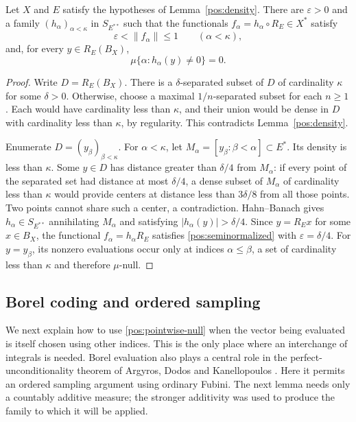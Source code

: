 \begin{lemma}\label{pos:family}
Let $X$ and $E$ satisfy the hypotheses of Lemma~\ref{pos:density}.
There are $\varepsilon>0$ and a family $(h_\alpha)_{\alpha<\kappa}$ in
$S_{E^{**}}$ such that the functionals
$f_\alpha=h_\alpha\circ R_E\in X^*$ satisfy
\begin{equation}\label{pos:seminormalized}
 \varepsilon<\|f_\alpha\|\le1\qquad(\alpha<\kappa),
\end{equation}
and, for every $y\in R_E(B_X)$,
\begin{equation}\label{pos:pointwise-null}
 \mu\{\alpha:h_\alpha(y)\ne0\}=0.
\end{equation}
\end{lemma}

\begin{proof}
Write $D=R_E(B_X)$.  There is a $\delta$-separated subset of $D$ of
cardinality $\kappa$ for some $\delta>0$.  Otherwise, choose a maximal
$1/n$-separated subset for each $n\ge1$.  Each would have cardinality
less than $\kappa$, and their union would be dense in $D$ with cardinality
less than $\kappa$, by regularity.  This contradicts
Lemma~\ref{pos:density}.

Enumerate $D=(y_\beta)_{\beta<\kappa}$.  For $\alpha<\kappa$, let
$M_\alpha=[y_\beta:\beta<\alpha]\subset E^*$.  Its density is less than
$\kappa$.  Some $y\in D$ has distance greater than $\delta/4$ from
$M_\alpha$: if every point of the separated set had distance at most
$\delta/4$, a dense subset of $M_\alpha$ of cardinality less than
$\kappa$ would provide centers at distance less than $3\delta/8$ from
all those points.  Two points cannot share such a center, a contradiction.
Hahn--Banach gives $h_\alpha\in S_{E^{**}}$ annihilating $M_\alpha$ and
satisfying $|h_\alpha(y)|>\delta/4$.  Since $y=R_Ex$ for some $x\in B_X$,
the functional $f_\alpha=h_\alpha R_E$ satisfies
\eqref{pos:seminormalized} with $\varepsilon=\delta/4$.
For $y=y_\beta$, its nonzero evaluations occur only at indices
$\alpha\le\beta$, a set of cardinality less than $\kappa$ and therefore
$\mu$-null.
\end{proof}

\subsection{Borel coding and ordered sampling}

We next explain how to use \eqref{pos:pointwise-null} when the vector
being evaluated is itself chosen using other indices.  This is the only
place where an interchange of integrals is needed.
Borel evaluation also plays a central role in the perfect-unconditionality
theorem of Argyros, Dodos and Kanellopoulos
\cite[Theorem~4]{ArgyrosDodosKanellopoulos2008}. Here it permits an
ordered sampling argument using ordinary Fubini. The next lemma needs
only a countably additive measure; the stronger additivity was used to
produce the family to which it will be applied.

